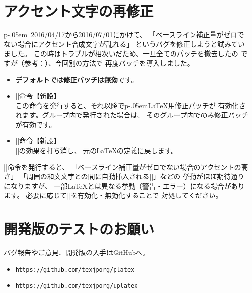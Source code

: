\documentclass{plnews}
\def\pLaTeX{p\kern-.05em\LaTeX}
\def\pLaTeXe{p\kern-.05em\LaTeXe}
\begin{document}
\section{アクセント文字の再修正}
\pLaTeXe\ 2016/04/17から2016/07/01にかけて、
「ベースライン補正量がゼロでない場合にアクセント合成文字が乱れる」
というバグを修正しようと試みていました。
この時はトラブルが相次いだため、一旦全てのパッチを撤去したの
ですが（参考：）、今回別の方法で
再度パッチを導入しました。
\begin{itemize}
\item \textbf{デフォルトでは修正パッチは無効}です。
\item |\fixcompositeaccent|命令【新設】\\
      この命令を発行すると、それ以降で\pLaTeX{}用修正パッチが
      有効化されます。グループ内で発行された場合は、
      そのグループ内でのみ修正パッチが有効です。
\item |\nofixcompositeaccent|命令【新設】\\
      |\fixcompositeaccent|の効果を打ち消し、
      元の\LaTeX{}の定義に戻します。
\end{itemize}
|\fixcompositeaccent|命令を発行すると、
「ベースライン補正量がゼロでない場合のアクセントの高さ」
「周囲の和文文字との間に自動挿入される|\xkanjiskip|」などの
挙動がほぼ期待通りになりますが、
一部\LaTeX{}とは異なる挙動（警告・エラー）になる場合があります。
必要に応じて|\fixcompositeaccent|を有効化・無効化することで
対処してください。


\section{開発版のテストのお願い}
バグ報告やご意見、開発版の入手はGitHubへ。
\begin{itemize}
\item \texttt{https://github.com/texjporg/platex}
\item \texttt{https://github.com/texjporg/uplatex}
\end{itemize}
\end{document}
